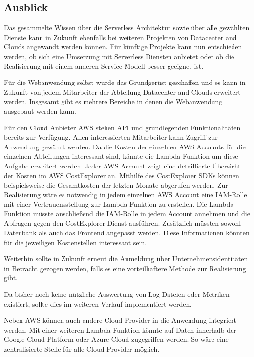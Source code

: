 \subsection{Ausblick}
Das gesammelte Wissen über die Serverless Architektur sowie über alle gewählten Dienste kann in Zukunft ebenfalls bei weiteren Projekten von Datacenter and Clouds angewandt werden können.
Für künftige Projekte kann nun entschieden werden, ob sich eine Umsetzung mit Serverless Diensten anbietet oder ob die Realisierung mit einem anderen Service-Modell besser geeignet ist.

Für die Webanwendung selbst wurde das Grundgerüst geschaffen und es kann in Zukunft von jedem Mitarbeiter der Abteilung Datacenter and Clouds erweitert werden.
Insgesamt gibt es mehrere Bereiche in denen die Webanwendung ausgebaut werden kann.

Für den Cloud Anbieter AWS stehen API und grundlegenden Funktionalitäten bereits zur Verfügung.
Allen interessierten Mitarbeiter kann Zugriff zur Anwendung gewährt werden.
Da die Kosten der einzelnen AWS Accounts für die einzelnen Abteilungen interessant sind, könnte die Lambda Funktion um diese Aufgabe erweitert werden.
Jeder AWS Account zeigt eine detaillierte Übersicht der Kosten im AWS CostExplorer an.
Mithilfe des CostExplorer SDKs können beispielsweise die Gesamtkosten der letzten Monate abgerufen werden.
Zur Realisierung wäre es notwendig in jedem einzelnen AWS Account eine IAM-Rolle mit einer Vertrauensstellung zur Lambda-Funktion zu erstellen.
Die Lambda-Funktion müsste anschließend die IAM-Rolle in jedem Account annehmen und die Abfragen gegen den CostExplorer Dienst ausführen.
Zusätzlich müssten sowohl Datenbank als auch das Frontend angepasst werden.
Diese Informationen könnten für die jeweiligen Kostenstellen interessant sein.

Weiterhin sollte in Zukunft erneut die Anmeldung über Unternehmensidentitäten in Betracht gezogen werden, falls es eine vorteilhaftere Methode zur Realisierung gibt.

Da bisher noch keine nützliche Auswertung von Log-Dateien oder Metriken existiert, sollte dies im weiteren Verlauf implementiert werden.

Neben AWS können auch andere Cloud Provider in die Anwendung integriert werden.
Mit einer weiteren Lambda-Funktion könnte auf Daten innerhalb der Google Cloud Platform oder Azure Cloud zugegriffen werden.
So wäre eine zentralisierte Stelle für alle Cloud Provider möglich.















